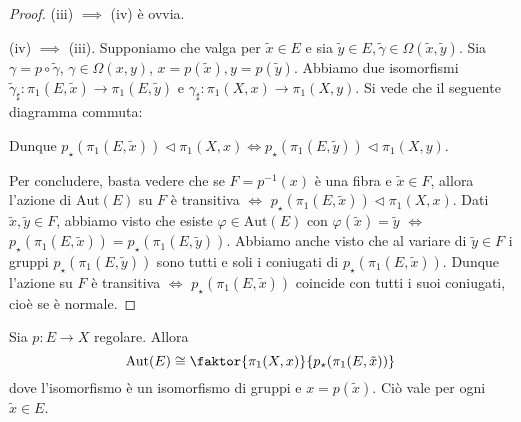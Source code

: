 \begin{proof}
  (iii) $\implies$ (iv) è ovvia.

  (iv) $\implies$ (iii). Supponiamo che valga per $\tilde{x} \in E$ e sia $\tilde{y} \in E, \tilde{\gamma} \in \Omega(\tilde{x}, \tilde{y})$. Sia $\gamma=p \circ \tilde{\gamma}$, $\gamma \in \Omega(x, y)$, $x=p(\tilde{x}), y=p(\tilde{y})$.
  Abbiamo due isomorfismi $\tilde{\gamma}_{\sharp}: \pi_1(E, \tilde{x}) \rightarrow \pi_1(E, \tilde{y})$ e $\gamma_{\sharp}:\pi_1(X, x) \rightarrow \pi_1(X, y)$. Si vede che il seguente diagramma commuta:
  \begin{center}
  \end{center}
  Dunque $p_{\star}(\pi_1(E, \tilde{x})) \vartriangleleft \pi_1(X, x) \iff p_{\star}(\pi_1(E, \tilde{y})) \vartriangleleft \pi_1(X, y)$.

  Per concludere, basta vedere che se $F=p^{-1}(x)$ è una fibra e $\tilde{x} \in F$, allora l'azione di $\text{Aut}(E)$ su $F$ è transitiva $\iff$ $p_{\star}(\pi_1(E, \tilde{x})) \vartriangleleft \pi_1(X, x)$.
  Dati $\tilde{x}, \tilde{y} \in F$, abbiamo visto che esiste $\varphi \in \text{Aut}(E)$ con $\varphi(\tilde{x})=\tilde{y}$ $\iff$ $p_{\star}(\pi_1(E, \tilde{x}))=p_{\star}(\pi_1(E, \tilde{y}))$.
  Abbiamo anche visto che al variare di $\tilde{y} \in F$ i gruppi $p_{\star}(\pi_1(E, \tilde{y}))$ sono tutti e soli i coniugati di $p_{\star}(\pi_1(E, \tilde{x}))$. Dunque l'azione su $F$ è transitiva $\iff$ $p_{\star}(\pi_1(E, \tilde{x}))$ coincide con tutti i suoi coniugati, cioè se è normale.
\end{proof}

\begin{thm}
  Sia $p:E \rightarrow X$ regolare. Allora
  $$\text{Aut}(E) \cong \faktor{\pi_1(X, x)}{p_{\star}(\pi_1(E, \tilde{x}))}$$
  dove l'isomorfismo è un isomorfismo di gruppi e $x=p(\tilde{x})$. Ciò vale per ogni $\tilde{x} \in E$.
\end{thm}

